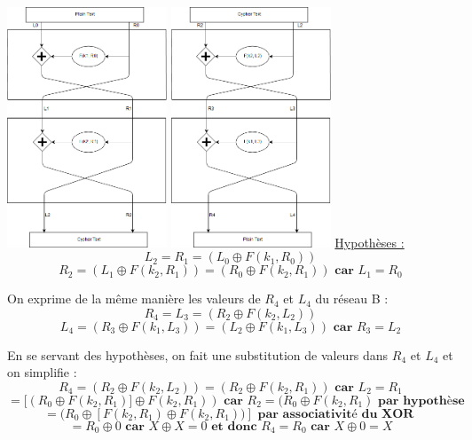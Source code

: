 \documentclass[fleqn]{article}
\begin{document}
    \includegraphics[width=180px]{FeistelIn.png}
    \includegraphics[width=180px]{FeistelOut.png}
\newline\newline
\underline{Hypothèses :}
\[L_2 = R_1 = \boxed{(L_0 \oplus F(k_1, R_0))}\]
\[R_2 = (L_1 \oplus F(k_2, R_1)) = \boxed{(R_0 \oplus F(k_2, R_1))} \textbf{ car } L_1 = R_0\]

On exprime de la même manière les valeurs de $R_4$ et $L_4$ du réseau B :
\[R_4 = L_3 = \boxed{(R_2 \oplus F(k_2, L_2))}\]
\[L_4 = (R_3 \oplus F(k_1, L_3)) = \boxed{(L_2 \oplus F(k_1, L_3))} \textbf{ car } R_3 = L_2\]\newline

En se servant des hypothèses, on fait une substitution de valeurs dans $R_4$ et $L_4$ et on simplifie :
\[R_4 = (R_2 \oplus F(k_2, L_2)) = (R_2 \oplus F(k_2, R_1)) \textbf{ car } L_2 = R_1\]
\[= [(R_0 \oplus F(k_2, R_1)] \oplus F(k_2, R_1)) \textbf{ car } R_2 = (R_0 \oplus F(k_2, R_1) \textbf{ par hypothèse}\]
\[= (R_0 \oplus [F(k_2, R_1) \oplus F(k_2, R_1))] \textbf{ par associativité du XOR }\]
\[= R_0 \oplus 0 \textbf{ car } X \oplus X = 0 \textbf{ et donc } \boxed{R_4 = R_0} \textbf{ car } X \oplus 0 = X\]
\end{document}
